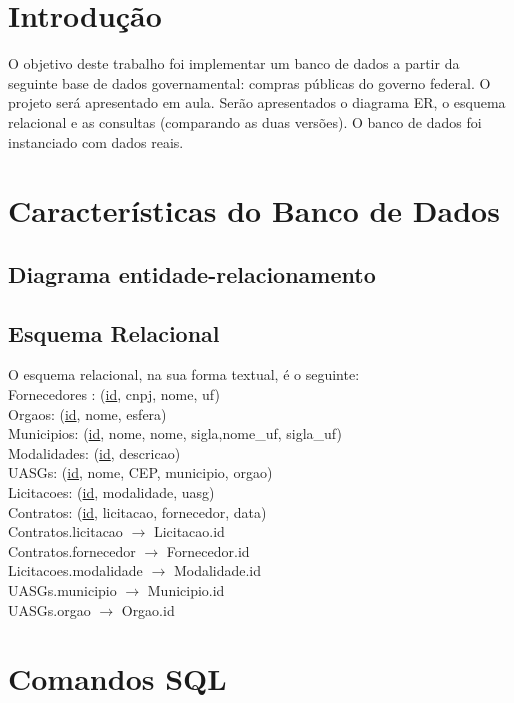 \documentclass{article}
\begin{document}
\newpage
{}
\section{Introdução}
O objetivo deste trabalho foi implementar um banco de dados a partir da seguinte base de dados
governamental: compras públicas do governo federal. O projeto será apresentado em aula. Serão apresentados o diagrama
ER, o esquema relacional e as consultas (comparando as duas versões). O banco de dados foi instanciado
com dados reais.


\section{Características do Banco de Dados}
\subsection { Diagrama entidade-relacionamento}
\subsection {Esquema Relacional}
\noindent
O esquema relacional, na sua forma textual, é o seguinte: \\[10pt]
Fornecedores : (\underline{id}, cnpj, nome, uf) \\
Orgaos: (\underline{id}, nome, esfera) \\
Municipios: (\underline{id}, nome, nome, sigla,nome\_uf, sigla\_uf) \\
Modalidades: (\underline{id}, descricao) \\
UASGs: (\underline{id}, nome, CEP, municipio, orgao) \\
Licitacoes: (\underline{id}, modalidade, uasg) \\
Contratos: (\underline{id}, licitacao, fornecedor, data) \\[5pt]
Contratos.licitacao $\rightarrow$ Licitacao.id \\
Contratos.fornecedor $\rightarrow$ Fornecedor.id \\
Licitacoes.modalidade $\rightarrow$ Modalidade.id \\
UASGs.municipio $\rightarrow$ Municipio.id \\
UASGs.orgao $\rightarrow$ Orgao.id


\section{Comandos SQL}
\end{document}
